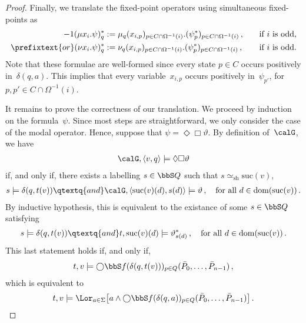 \documentclass[10pt, fleqn]{scrartcl}
\DeclareRobustCommand*{\dom}{\qopname\relax o{dom}}
\newcommand*{\sh}{\mathrm{sh}}
\newcommand*{\suc}{\mathrm{suc}}
\newcommand*{\?}{\kern .08em}
\newcommand\medcircle{\bigcirc}
\begin{document}
\begin{proof}
Finally, we translate the fixed-point operators using simultaneous fixed-points as
\begin{alignat*}{-1}
  (\mu x_i.\psi)^*_q &:=
    \mu_q (x_{i,p})_{p \in C \cap \Omega^{-1}(i)}.(\psi^*_p)_{p \in C \cap \Omega^{-1}(i)}\,,
    &&\quad\text{if $i$ is odd,} \\
\prefixtext{or}
  (\nu x_i.\psi)^*_q &:=
    \nu_q (x_{i,p})_{p \in C \cap \Omega^{-1}(i)}.(\psi^*_p)_{p \in C \cap \Omega^{-1}(i)}\,,
    &&\quad\text{if $i$ is odd.}
\end{alignat*}
Note that these formulae are well-formed since every state $p \in C$ occurs positively
in~$\delta(q,a)$. This implies that every variable~$x_{i,p}$ occurs positively in~$\psi_{p'}$,
for $p,p' \in C \cap \Omega^{-1}(i)$.

It remains to prove the correctness of our translation. We proceed by induction on the
formula~$\psi$. Since most steps are straightforward, we only consider the case of the
modal operator. Hence, suppose that $\psi = {\Diamond}{\Box}\vartheta$.
By definition of~$\calG$, we have
\begin{align*}
  \calG,\langle v,q\rangle \models {\Diamond}{\Box}\vartheta
\end{align*}
if, and only if, there exists a labelling $s \in \bbS Q$ such that $s \simeq_\sh \suc(v)$,
\begin{align*}
  s \models \delta(q,t(v))
  \qtextq{and}
  \calG,\langle\suc(v)(d),s(d)\rangle \models \vartheta\,, \quad\text{for all } d \in \dom(\suc(v))\,.
\end{align*}
By inductive hypothesis, this is equivalent to the existance of some $s \in \bbS Q$ satisfying
\begin{align*}
  s \models \delta(q,t(v))
  \qtextq{and}
  t,\suc(v)(d) \models \vartheta^*_{s(d)}\,, \quad\text{for all } d \in \dom(\suc(v))\,.
\end{align*}
This last statement holds if, and only if,
\begin{align*}
  t,v \models
    {\medcircle}\bbS f(\delta(q,t(v)))_{p \in Q}(\bar P_0,\dots,\bar P_{n-1})\,,
\end{align*}
which is equivalent to
\begin{align*}
  t,v \models
    \Lor_{a \in \Sigma}
      \bigl[a \land {\medcircle}\bbS f(\delta(q,a))_{p \in Q}(\bar P_0,\dots,\bar P_{n-1})\bigr]\,.
\end{align*}


\end{proof}
\end{document}
